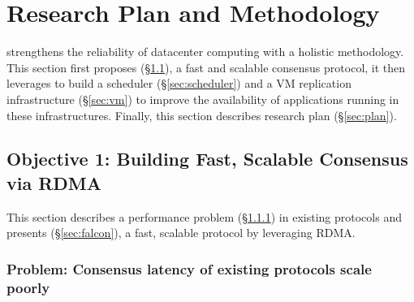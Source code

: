 \vspace{-.15in}\section{Research Plan and Methodology}
\label{sec:rep}\vspace{-.075in}

\xxx strengthens the reliability of datacenter computing with a holistic 
methodology. This section first proposes \falcon (\S\ref{sec:protocol}), a fast 
and scalable consensus protocol, it then leverages \falcon to build a scheduler 
(\S\ref{sec:scheduler}) and a VM replication infrastructure (\S\ref{sec:vm}) to 
improve the availability of applications running in these infrastructures. 
Finally, this section describes research plan (\S\ref{sec:plan}).

\vspace{-.15in}\subsection{Objective 1: Building Fast, Scalable Consensus via
RDMA}\label{sec:protocol}\vspace{-.075in}

This section describes a performance problem (\S\ref{sec:latency-problem}) in 
existing \paxos protocols and presents \falcon (\S\ref{sec:falcon}), a 
fast, scalable \paxos protocol by leveraging RDMA.

\vspace{-.15in}
\subsubsection{Problem: Consensus latency of existing \paxos 
protocols scale poorly} 
\label{sec:latency-problem}\vspace{-.075in}



